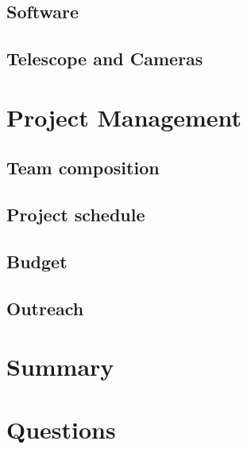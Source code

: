 \documentclass[11pt, aspectratio=169]{beamer}
\begin{document}
\subsection{Software}



\subsection{Telescope and Cameras}

\section{Project Management}
\subsection{Team composition}
\subsection{Project schedule}

\subsection{Budget}
    
\subsection{Outreach}


\section{Summary}

\section{Questions}
\end{document}
